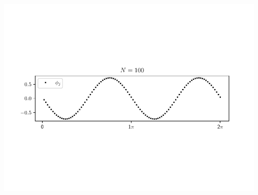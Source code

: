 \begin{Figure}
    \centering
    \captionsetup{type = figure}
    \includegraphics[width = \textwidth]{phi6_a2_b1_N100.pdf}
    \label{fig:phi6_a2_b1_N100}
\end{Figure}

